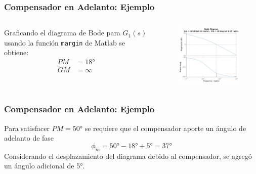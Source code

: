 \documentclass[aspectratio=169]{beamer}
\theoremstyle{definition}
\theoremstyle{plain}
\theoremstyle{remark}
\begin{document}
\begin{frame}[<+->]\frametitle{Compensador en Adelanto: Ejemplo}
	\vspace*{-7mm}
  \begin{columns}
  	\begin{column}{0.4\textwidth}
			Graficando el diagrama de Bode para $G_1(s)$ usando la función \texttt{margin} de Matlab se obtiene:
			\begin{align*}
				PM &= \ang{18}\\
				GM &= \infty
			\end{align*}
  	\end{column}
  	\begin{column}{0.6\textwidth}
			\begin{figure}
				\centering
				\includegraphics[width=8.5cm]{images/bodeLeadCompExample.eps} 	
		  \end{figure}
  	\end{column}
  \end{columns}
\end{frame}

\begin{frame}[<+->]\frametitle{Compensador en Adelanto: Ejemplo}   
	Para satisfacer $PM = \ang{50}$ se requiere que el compensador aporte un ángulo de adelanto de fase 
	\begin{equation*}
		\phi_m = \ang{50} - \ang{18} + \ang{5} = \ang{37}
	\end{equation*}
	Considerando el desplazamiento del diagrama debido al compensador, se agregó un ángulo adicional de \ang{5}.
\end{frame}
\end{document}
